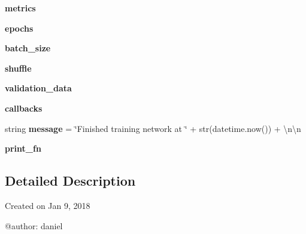 \begin{DoxyCompactItemize}
\mbox{\label{namespaceTrainModels_a6ff2682be67a40f553a1801f69f85f26}} 
{\bfseries metrics}
\item 
\mbox{\label{namespaceTrainModels_af2c2dea367d702db60c078667cf2eaea}} 
{\bfseries epochs}
\item 
\mbox{\label{namespaceTrainModels_a92637a2537af19f015ba2666fb8c6117}} 
{\bfseries batch\+\_\+size}
\item 
\mbox{\label{namespaceTrainModels_a936e377cde3b4ab7e92a90cf035c6a35}} 
{\bfseries shuffle}
\item 
\mbox{\label{namespaceTrainModels_a5cafabc3d9c8f3b4e437dd6c3b8e6ba9}} 
{\bfseries validation\+\_\+data}
\item 
\mbox{\label{namespaceTrainModels_a558f6c19a7082301c13f8a1b6eab1578}} 
{\bfseries callbacks}
\item 
\mbox{\label{namespaceTrainModels_a2a441954e4be8ff98449c8fa66dc004b}} 
string {\bfseries message} = \char`\"{}Finished training network at \char`\"{} + str(datetime.\+now()) + \textquotesingle{}\textbackslash{}n\textbackslash{}n\textquotesingle{}
\item 
\mbox{\label{namespaceTrainModels_aba63ee2817e2a1983cf68d6dd26ed116}} 
{\bfseries print\+\_\+fn}
\end{DoxyCompactItemize}


\subsection{Detailed Description}
\begin{DoxyVerb}Created on Jan 9, 2018

@author: daniel
\end{DoxyVerb}
 